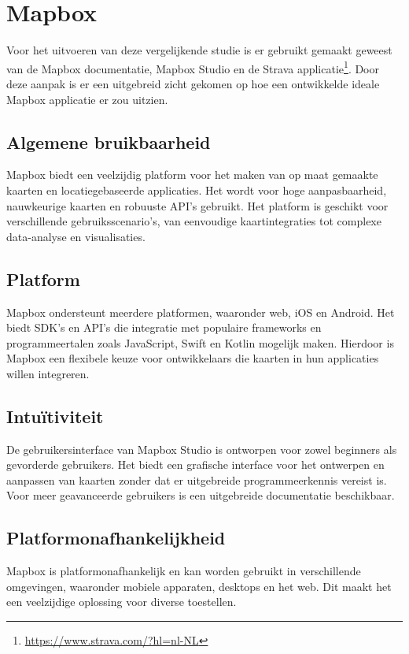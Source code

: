 \section{Mapbox}
\label{sec:mapbox}


Voor het uitvoeren van deze vergelijkende studie is er gebruikt gemaakt geweest van de Mapbox documentatie, Mapbox Studio en de Strava applicatie\footnote{\url{https://www.strava.com/?hl=nl-NL}}. Door deze aanpak is er een uitgebreid zicht gekomen op hoe een ontwikkelde ideale Mapbox applicatie er zou uitzien.

\subsection*{Algemene bruikbaarheid}
Mapbox biedt een veelzijdig platform voor het maken van op maat gemaakte kaarten en locatiegebaseerde applicaties. Het wordt voor hoge aanpasbaarheid, nauwkeurige kaarten en robuuste API's gebruikt. Het platform is geschikt voor verschillende gebruiksscenario's, van eenvoudige kaartintegraties tot complexe data-analyse en visualisaties.

\subsection*{Platform}
Mapbox ondersteunt meerdere platformen, waaronder web, iOS en Android. Het biedt SDK's en API's die integratie met populaire frameworks en programmeertalen zoals JavaScript, Swift en Kotlin mogelijk maken. Hierdoor is Mapbox een flexibele keuze voor ontwikkelaars die kaarten in hun applicaties willen integreren.

\subsection*{Intuïtiviteit}
De gebruikersinterface van Mapbox Studio is ontworpen voor zowel beginners als gevorderde gebruikers. Het biedt een grafische interface voor het ontwerpen en aanpassen van kaarten zonder dat er uitgebreide programmeerkennis vereist is. Voor meer geavanceerde gebruikers is een uitgebreide documentatie beschikbaar.

\subsection*{Platformonafhankelijkheid}
Mapbox is platformonafhankelijk en kan worden gebruikt in verschillende omgevingen, waaronder mobiele apparaten, desktops en het web. Dit maakt het een veelzijdige oplossing voor diverse toestellen.

